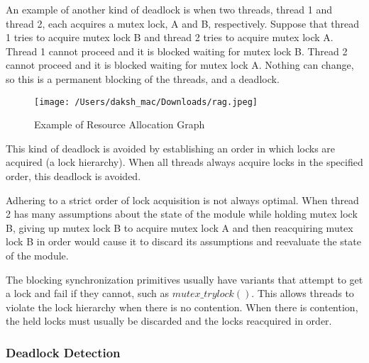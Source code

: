 \documentclass[12pt]{article}
\begin{document}
An example of another kind of deadlock is when two threads, thread 1 and thread 2, each acquires a mutex lock, A and B, respectively. Suppose that thread 1 tries to acquire mutex lock B and thread 2 tries to acquire mutex lock A. Thread 1 cannot proceed and it is blocked waiting for mutex lock B. Thread 2 cannot proceed and it is blocked waiting for mutex lock A. Nothing can change, so this is a permanent blocking of the threads, and a deadlock.


\begin{figure}[H]
	\centering
	\texttt{[image: /Users/daksh\_mac/Downloads/rag.jpeg]}
	\caption[About deadlock]{Example of Resource Allocation Graph}
	\label{fig:rag}	
\end{figure}

This kind of deadlock is avoided by establishing an order in which locks are acquired (a lock hierarchy). When all threads always acquire locks in the specified order, this deadlock is avoided.

Adhering to a strict order of lock acquisition is not always optimal. When thread 2 has many assumptions about the state of the module while holding mutex lock B, giving up mutex lock B to acquire mutex lock A and then reacquiring mutex lock B in order would cause it to discard its assumptions and reevaluate the state of the module.

The blocking synchronization primitives usually have variants that attempt to get a lock and fail if they cannot, such as $mutex\_trylock()$. This allows threads to violate the lock hierarchy when there is no contention. When there is contention, the held locks must usually be discarded and the locks reacquired in order.



\subsubsection{Deadlock Detection}
\end{document}
